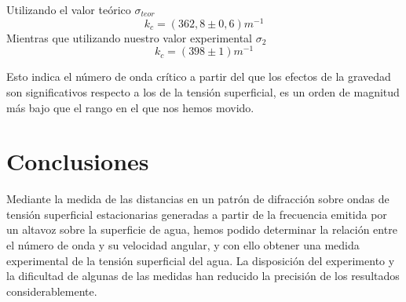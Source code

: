 \documentclass[a4paper,12pt,spanish]{article}
\begin{document}
	
	Utilizando el valor teórico $\sigma_{teor}$
	\[ k_c = (362,8 \pm 0,6) \si{m^{-1}}
	\]
	Mientras que utilizando nuestro valor experimental $\sigma_2$
	\[ k_c = (398\pm 1)\si{m^{-1}}
	\]
	
	
	Esto indica el número de onda crítico a partir del que los efectos de la gravedad son significativos respecto a los de la tensión superficial, es un orden de magnitud más bajo que el rango en el que nos hemos movido.
	
	
	
	
	
	\section{Conclusiones}
	
	
	
	Mediante la medida de las distancias en un patrón de difracción sobre ondas de tensión superficial estacionarias generadas a partir de la frecuencia emitida por un altavoz sobre la superficie de agua, hemos podido determinar la relación entre el número de onda y su velocidad angular, y con ello obtener una medida experimental de la tensión superficial del agua. La disposición del experimento y la dificultad de algunas de las medidas han reducido la precisión de los resultados considerablemente.
	
	
	
	
	
	
	
	
	
	
	
	
\end{document}
